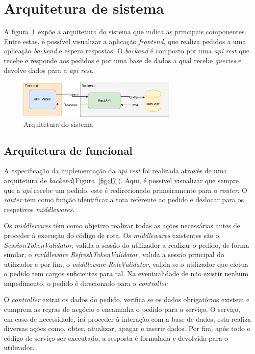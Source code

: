 \section{Arquitetura de sistema}
A figura~\ref{fig:46} expõe a arquitetura do sistema que indica as principais componentes. Entre estas, é possível visualizar a aplicação \textit{frontend}, que realiza pedidos a uma aplicação \textit{backend} e espera respostas. O \textit{backend} é composto por uma \textit{api rest} que recebe e responde aos pedidos e por uma base de dados a qual recebe \textit{queries} e devolve dados para a \textit{api rest}.

\begin{figure}[htb]
  \centering
  
  \includegraphics[width=0.7\textwidth]{images/Arquiteturas/arquitetura_de_solucao.png}
  \caption{Arquitetura do sistema}
  \label{fig:46}
\end{figure}

\subsection{Arquitetura de funcional}
A especificação da implementação da \textit{api rest} foi realizada através de uma arquitetura de \textit{backend}(Figura~\ref{fig:47}). Aqui, é possível visualizar que sempre que a \textit{api} recebe um pedido, este é redirecionado primeiramente para o \textit{router}. O \textit{router} tem como função identificar a rota referente ao pedido e deslocar para os respetivos \textit{middlewares}. 

Os \textit{middlewares} têm como objetivo realizar todas as ações necessárias antes de proceder à execução do código de rota. Os \textit{middlewares} existentes são o \textit{SessionTokenValidator}, valida a sessão do utilizador a realizar o pedido, de forma similar, o \textit{middleware RefreshTokenValidator}, valida a sessão principal do utilizador e por fim, o \textit{middleware} \textit{RoleValidator}, valida se o utilizador que efetua o pedido tem cargos suficientes para tal. Na eventualidade de não existir nenhum impedimento, o pedido é direcionado para o \textit{controller}.

O \textit{controller} extrai os dados do pedido, verifica se os dados obrigatórios existem e cumprem as regras de negócio e encaminha o pedido para o serviço. O serviço, em caso de necessidade, irá proceder à interação com a base de dados, esta realiza diversas ações como, obter, atualizar, apagar e inserir dados. Por fim, após todo o código de serviço ser executado, a resposta é formulada e devolvida para o utilizador.

